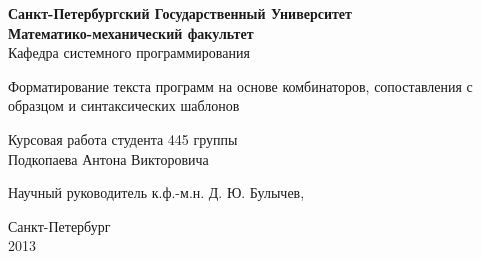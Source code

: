 \begin{titlepage}
\newpage

\begin{center}
	\textbf{
		Санкт-Петербургский Государственный Университет \\
		Математико-механический факультет \\
	}
	Кафедра системного программирования
\end{center}

\vspace{15em}

\begin{center}
\Large Форматирование текста программ на основе комбинаторов, сопоставления с образцом и синтаксических шаблонов \\ 
\end{center}

\vspace{2em}

\begin{center}
Курсовая работа студента 445 группы \\
Подкопаева Антона Викторовича

\end{center}

\vspace{10em}

Научный руководитель\dotfill
к.ф.-м.н. Д. Ю. Булычев,


\vspace{\fill}

\begin{center}
Санкт-Петербург \\2013
\end{center}

\end{titlepage}